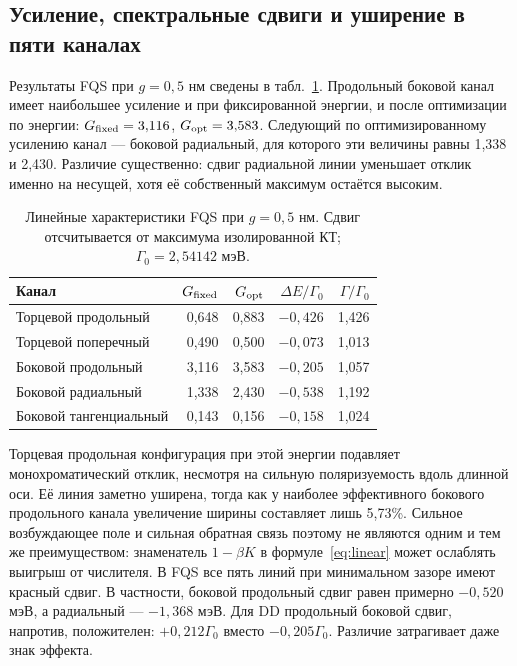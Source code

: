 \subsection{Усиление, спектральные сдвиги и уширение в пяти каналах}
Результаты FQS при $g=0{,}5$ нм сведены в табл.~\ref{tab:linear}.
Продольный боковой канал имеет наибольшее усиление и при фиксированной
энергии, и после оптимизации по энергии: $G_{\rm fixed}=3{,}116$,
$G_{\rm opt}=3{,}583$. Следующий по оптимизированному усилению канал
--- боковой радиальный, для которого эти величины равны 1,338 и 2,430.
Различие существенно: сдвиг радиальной линии уменьшает отклик именно
на несущей, хотя её собственный максимум остаётся высоким.

\begin{table}[!htbp]\centering\small
\caption{Линейные характеристики FQS при $g=0{,}5$ нм.
Сдвиг отсчитывается от максимума изолированной КТ;
$\Gamma_0=2{,}54142$ мэВ.}
\label{tab:linear}
\begin{tabular}{lrrrr}\toprule
Канал & $G_{\rm fixed}$ & $G_{\rm opt}$ & $\Delta E/\Gamma_0$ & $\Gamma/\Gamma_0$\\\midrule
Торцевой продольный & 0,648 & 0,883 & $-0,426$ & 1,426\\
Торцевой поперечный & 0,490 & 0,500 & $-0,073$ & 1,013\\
Боковой продольный & 3,116 & 3,583 & $-0,205$ & 1,057\\
Боковой радиальный & 1,338 & 2,430 & $-0,538$ & 1,192\\
Боковой тангенциальный & 0,143 & 0,156 & $-0,158$ & 1,024\\\bottomrule
\end{tabular}
\end{table}

Торцевая продольная конфигурация при этой энергии подавляет
монохроматический отклик, несмотря на сильную поляризуемость вдоль
длинной оси. Её линия заметно уширена, тогда как у наиболее эффективного
бокового продольного канала увеличение ширины составляет лишь 5,73\%.
Сильное возбуждающее поле и сильная обратная связь поэтому не являются
одним и тем же преимуществом: знаменатель $1-\beta K$ в
формуле~\eqref{eq:linear} может ослаблять выигрыш от числителя.
В FQS все пять линий при минимальном зазоре имеют красный сдвиг.
В частности, боковой продольный сдвиг равен примерно $-0{,}520$ мэВ,
а радиальный --- $-1{,}368$ мэВ. Для DD продольный боковой сдвиг,
напротив, положителен: $+0{,}212\Gamma_0$ вместо
$-0{,}205\Gamma_0$. Различие затрагивает даже знак эффекта.


